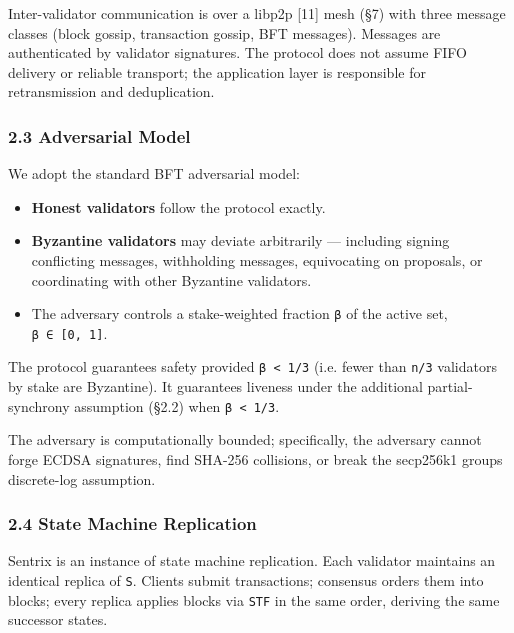 \documentclass[11pt,a4paper]{article}
\providecommand{\tightlist}{\setlength{\itemsep}{0pt}\setlength{\parskip}{0pt}}
\begin{document}
Inter-validator communication is over a libp2p {[}11{]} mesh (§7) with
three message classes (block gossip, transaction gossip, BFT messages).
Messages are authenticated by validator signatures. The protocol does
not assume FIFO delivery or reliable transport; the application layer is
responsible for retransmission and deduplication.

\hypertarget{23-adversarial-model}{%
\subsubsection{2.3 Adversarial Model}\label{23-adversarial-model}}

We adopt the standard BFT adversarial model:

\begin{itemize}
\tightlist
\item
  \textbf{Honest validators} follow the protocol exactly.
\item
  \textbf{Byzantine validators} may deviate arbitrarily --- including
  signing conflicting messages, withholding messages, equivocating on
  proposals, or coordinating with other Byzantine validators.
\item
  The adversary controls a stake-weighted fraction \texttt{β} of the
  active set, \texttt{β\ ∈\ {[}0,\ 1{]}}.
\end{itemize}

The protocol guarantees safety provided \texttt{β\ \textless{}\ 1/3}
(i.e. fewer than \texttt{n/3} validators by stake are Byzantine). It
guarantees liveness under the additional partial-synchrony assumption
(§2.2) when \texttt{β\ \textless{}\ 1/3}.

The adversary is computationally bounded; specifically, the adversary
cannot forge ECDSA signatures, find SHA-256 collisions, or break the
secp256k1 group\textquotesingle s discrete-log assumption.

\hypertarget{24-state-machine-replication}{%
\subsubsection{2.4 State Machine
Replication}\label{24-state-machine-replication}}

Sentrix is an instance of state machine replication. Each validator
maintains an identical replica of \texttt{S}. Clients submit
transactions; consensus orders them into blocks; every replica applies
blocks via \texttt{STF} in the same order, deriving the same successor
states.
\end{document}
